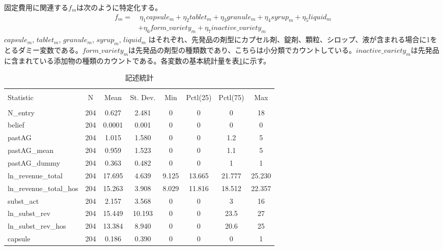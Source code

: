 \documentclass[a4j,10.5pt]{jarticle}
\begin{document}
固定費用に関連する$f_m$は次のように特定化する。
\begin{align}
    f_m = 
    & \  \eta_1 capsule_m+ \eta_2 tablet_m+ \eta_3 granule_m+ \eta_4 syrup_m+ \eta_5 liquid_m \nonumber \\ 
    & + \eta_6 form\_variety_m+ \eta_7 inactive\_variety_m
\end{align}
$capsule_m$, $tablet_m$, $granule_m$, $syrup_m$, $liquid_m$ はそれぞれ、先発品の剤型にカプセル剤、錠剤、顆粒、シロップ、液が含まれる場合に1をとるダミー変数である。$form\_variety_m$は先発品の剤型の種類数であり、こちらは小分類でカウントしている。$inactive\_variety_m$は先発品に含まれている添加物の種類のカウントである。各変数の基本統計量を表\ref{summary}に示す。
\begin{table}[!htbp] 
    \centering 
    \caption{記述統計} 
    \label{summary} 
    \begin{tabular}{@{\extracolsep{5pt}}lccccccc} 
        \\[-1.8ex]\hline 
        \hline \\[-1.8ex] 
        Statistic & \multicolumn{1}{c}{N} & \multicolumn{1}{c}{Mean} & \multicolumn{1}{c}{St. Dev.} & \multicolumn{1}{c}{Min} & \multicolumn{1}{c}{Pctl(25)} & \multicolumn{1}{c}{Pctl(75)} & \multicolumn{1}{c}{Max} \\ 
        \hline \\[-1.8ex] 
        N\_entry & 204 & 0.627 & 2.481 & 0 & 0 & 0 & 18 \\ 
        belief & 204 & 0.0001 & 0.001 & 0 & 0 & 0 & 0 \\ 
        pastAG & 204 & 1.015 & 1.580 & 0 & 0 & 1.2 & 5 \\ 
        pastAG\_mean & 204 & 0.959 & 1.523 & 0 & 0 & 1.1 & 5 \\ 
        pastAG\_dummy & 204 & 0.363 & 0.482 & 0 & 0 & 1 & 1 \\ 
        ln\_revenue\_total & 204 & 17.695 & 4.639 & 9.125 & 13.665 & 21.777 & 25.230 \\ 
        ln\_revenue\_total\_hos & 204 & 15.263 & 3.908 & 8.029 & 11.816 & 18.512 & 22.357 \\ 
        subst\_act & 204 & 2.157 & 3.568 & 0 & 0 & 3 & 16 \\ 
        ln\_subst\_rev & 204 & 15.449 & 10.193 & 0 & 0 & 23.5 & 27 \\ 
        ln\_subst\_rev\_hos & 204 & 13.384 & 8.940 & 0 & 0 & 20.6 & 25 \\ 
        capsule & 204 & 0.186 & 0.390 & 0 & 0 & 0 & 1 \\ 

\end{tabular}
\end{table}
\end{document}
